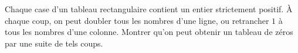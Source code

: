 Chaque case d'un tableau rectangulaire contient un entier strictement positif. À chaque coup, on peut doubler tous les nombres d'une ligne, ou retrancher $1$ à tous les nombres d'une colonne. Montrer qu'on peut obtenir un tableau de zéros par une suite de tels coups.
